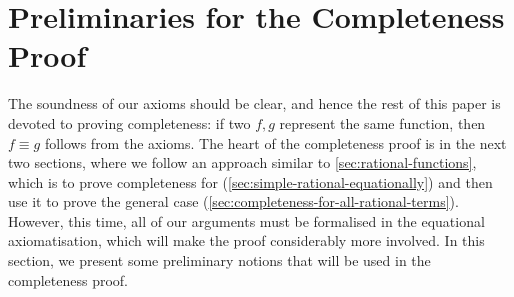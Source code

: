 \section{Preliminaries for the Completeness Proof}
\label{sec:proof-overview}
The soundness of our axioms should be clear, and hence the rest of this paper is devoted to proving completeness: if two  $f, g$ represent the same function, then  $f \equiv g$ follows from the axioms. The heart of the completeness proof is in the next two sections,  where we follow an approach similar to \cref{sec:rational-functions}, which is to prove completeness for  (\cref{sec:simple-rational-equationally}) and then use it to prove the general case (\cref{sec:completeness-for-all-rational-terms}). However, this time, all of our arguments must be formalised in the equational axiomatisation, which  will make the proof considerably more involved. In this section, we present some preliminary notions that will be used in the completeness proof.

